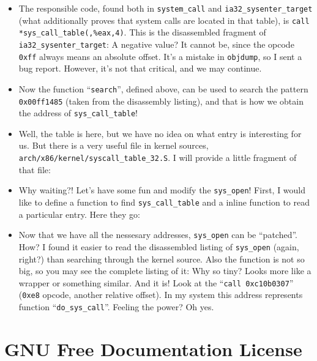 \documentclass[12pt]{article}
\begin{document}
  \begin{itemize}
  \item The responsible code, found both in \verb!system_call! and
    \verb!ia32_sysenter_target! (what additionally proves that system calls
    are located in that table), is \verb!call *sys_call_table(,%eax,4)!. This
    is the disassembled fragment of \verb!ia32_sysenter_target!:
     A negative value?  It cannot be, since the
    opcode \verb!0xff! always means an absolute offset. It's a mistake in
    \verb!objdump!, so I sent a bug report. However, it's not that critical,
    and we may continue.

  \item Now the function ``\verb!search!'', defined above, can be used to
    search the pattern \verb!0x00ff1485! (taken from the disassembly listing),
    and that is how we obtain the address of \verb!sys_call_table!!

  \item Well, the table is here, but we have no idea on what entry is
    interesting for us. But there is a very useful file in kernel sources,
    \verb!arch/x86/kernel/syscall_table_32.S!. I will provide a little
    fragment of that file: 

  \item Why waiting?! Let's have some fun and modify the \verb!sys_open!!
    First, I would like to define a function to find \verb!sys_call_table! and
    a inline function to read a particular entry. Here they go:
    

  \item Now that we have all the nessesary addresses, \verb!sys_open! can be
    ``patched''. How? I found it easier to read the disassembled listing of
    \verb!sys_open! (again, right?) than searching through the kernel
    source. Also the function is not so big, so you may see the complete
    listing of it:  Why so tiny? Looks more like a
    wrapper or something similar. And it is! Look at the
    ``\verb!call 0xc10b0307!'' (\verb!0xe8! opcode, another relative
    offset). In my system this address represents function
    ``\verb!do_sys_call!''. Feeling the power? Oh yes.
  \end{itemize}

\newpage
\appendix
\section{GNU Free Documentation License}

\end{document}
